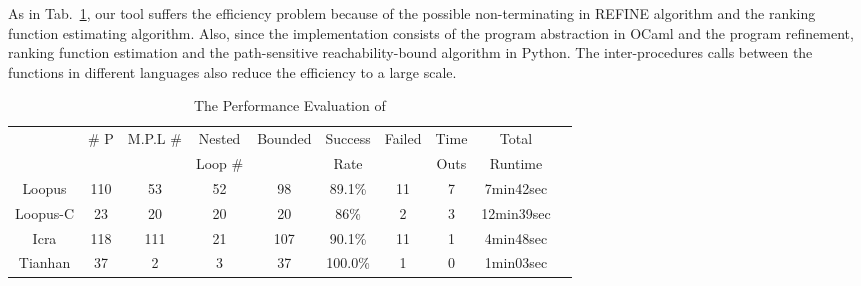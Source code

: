 As in Tab.~\ref{tb:performance-eval}, our tool suffers the efficiency problem because of the possible non-terminating in REFINE algorithm and the ranking function estimating algorithm.
Also, since the implementation consists of the 
program abstraction in OCaml and the program refinement, ranking function estimation and the path-sensitive reachability-bound algorithm in Python.
The inter-procedures calls between the functions in different languages also reduce the efficiency to a large scale.


\begin{table}[H]
    \caption{The Performance Evaluation of {\THESYSTEM}}
    \label{tb:performance-eval}
    \centering
        {\footnotesize
        \begin{tabular}{ >{\small}c | c | c | c | c | c | c | c | c | c }
            \multirow{2}{*}{Benchmark} & \multirow{2}{*}{\# P}  & \multirow{2}{*}{M.P.L \#} & Nested  & \multirow{2}{*}{Bounded} & {Success} & \multirow{2}{*}{Failed} & Time  & Total\\
             &  &  & Loop \# & & Rate &  & Outs &   Runtime \\
            \hline
                {Loopus} & {110}  & 53  & 52  & 98 & 89.1\% & 11 & 7 & 7min42sec \\
                \hline
                Loopus-C & 23  & 20 & 20 & {20} & {86\%}  & 2 & 3 & {12min39sec} \\
                \hline
                {Icra} & 118 & 111 & 21 & 107 & 90.1\% & 11 & 1 & {4min48sec} \\
                \hline
                Tianhan & 37 & 2 & 3 & 37 & 100.0\% & 1 & 0 & 1min03sec \\
                \hline
            \end{tabular}    
        }
    \end{table}
